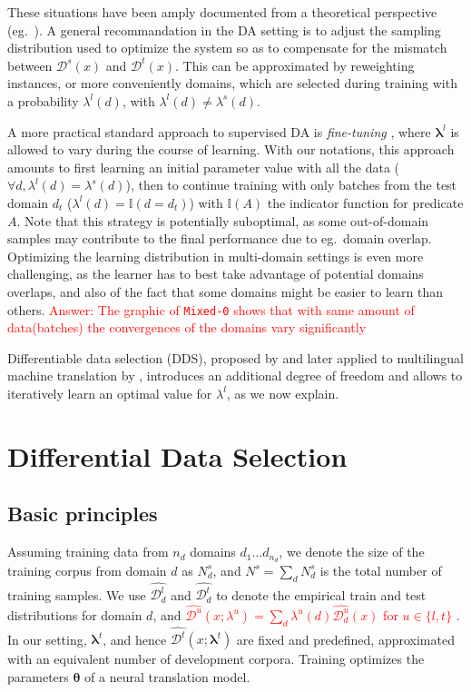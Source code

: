 \documentclass[11pt,a4paper]{article}
\newcommand{\fyTodo}[1]{\Todo[FY:]{\textcolor{orange}{#1}}}
\newcommand{\revision}[1]{\textcolor{red}{#1}}
\newcommand{\system}[1]{\texttt{{#1}}}
\newcommand{\vlambda}{\ensuremath{\boldsymbol\lambda}\xspace} %
\newcommand{\vtheta}{\ensuremath{\boldsymbol\theta}\xspace} %
\newcommand{\indic}[1]{\ensuremath{\mathbb{I}(#1)}}
\begin{document}
These situations have been amply documented from a theoretical perspective (eg.\ \cite{Mansour09multiple,Mansour09domainadaptation,Hoffman18algorithms}). A general recommandation in the DA setting  is to adjust the sampling distribution used to optimize the system so as to compensate for the mismatch between $\mathcal{D}^s(x)$ and $\mathcal{D}^t(x)$. This can be approximated by reweighting instances, or more conveniently domains, which are selected during training with a probability $\lambda^{l}(d)$, with $\lambda^{l}(d) \neq \lambda^{s}(d)$.

A more practical standard approach to supervised DA is \emph{fine-tuning} \cite{Luong15stanford,Freitag16fast}, where $\vlambda^{l}$ is allowed to vary during the course of learning. With our notations, this approach amounts to first learning an initial parameter value with all the data ($\forall d, \lambda^{l}(d) = \lambda^{s}(d)$), then to continue training with only batches from the test domain $d_t$ ($\lambda^{l}(d) = \indic{d = d_t}$) with $\indic{A}$ the indicator function for predicate $A$. Note that this strategy is potentially suboptimal, as some out-of-domain samples may contribute to the final performance due to eg.\ domain overlap. Optimizing the learning distribution in multi-domain settings is even more challenging, as the learner has to best take advantage of potential domains overlaps, and also of the fact that some domains might be easier to learn than others.\fyTodo{How to measure this?} \revision{Answer: The graphic of \system{Mixed-0} shows that with same amount of data(batches) the convergences of the domains vary significantly}

Differentiable data selection (DDS), proposed by \citet{Wang20optimizing} and later applied to multilingual machine translation by \citet{Wang20balancing}, introduces an additional degree of freedom and allows to iteratively learn an optimal value for $\lambda^{l}$, as we now explain.


\section{Differential Data Selection} \label{sec:dds}
\subsection{Basic principles}
Assuming training data from $n_d$ domains $d_1 \dots d_{n_d}$, we denote the size of the training corpus from domain $d$ as  $N^{s}_d$, and $N^{s} = \sum_d N^{s}_d$ is the total number of training samples. We use $\widehat{\mathcal{D}^l_d}$ and $\widehat{\mathcal{D}^t _d}$ to denote the empirical train and test distributions for domain $d$, and \revision{$\widehat{\mathcal{D}^{u}}(x;\lambda^{u}) = \sum_{d} \lambda^{u}(d) \widehat{\mathcal{D}^{u}_d}(x)$ for $u\in\{l,t\}$} \fyTodo{$\widehat{\mathcal{D}}(x;\lambda) = \sum_{d} \lambda(d) \widehat{\mathcal{D}_d}(x)$}. In our setting,  $\vlambda^t$, and hence $\widehat{\mathcal{D}^t}(x;\vlambda^t)$ are fixed and predefined, approximated with an equivalent number of development corpora. Training optimizes the parameters $\vtheta$ of a neural translation model.
\end{document}
